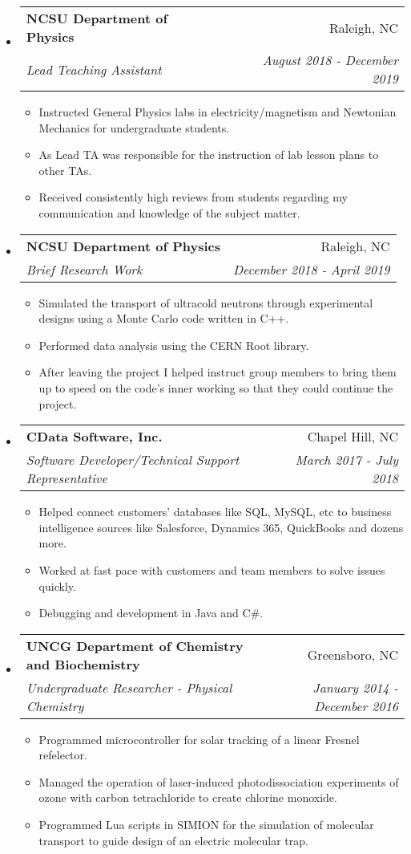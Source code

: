 \documentclass[letterpaper,11pt]{article}
\makeatletter
\newcommand{\resitem}[1]{\item #1 \vspace{-2pt}}
\newcommand{\ressubheading}[4]{
\begin{tabular*}{6.5in}{l@{\cftdotfill{\cftsecdotsep}\extracolsep{\fill}}r}
		\textbf{#1} & #2 \\
		\textit{#3} & \textit{#4} \\
\end{tabular*}\vspace{-6pt}}
\makeatother
\begin{document}
\begin{itemize}
\begin{itemize}
	\end{itemize}



\item
	\ressubheading{NCSU Department of Physics}{Raleigh, NC}{Lead Teaching Assistant}{August 2018 - December 2019}
	\begin{itemize}
      \resitem{Instructed General Physics labs in electricity/magnetism and Newtonian Mechanics for undergraduate students.}
      \resitem{As Lead TA was responsible for the instruction of lab lesson plans to other TAs.}
      \resitem{Received consistently high reviews from students regarding my communication and knowledge of the subject matter.}
	\end{itemize}
	
\item
	\ressubheading{NCSU Department of Physics}{Raleigh, NC}{Brief Research Work}{December 2018 - April 2019}
	\begin{itemize}
      \resitem{Simulated the transport of ultracold neutrons through experimental designs using a Monte Carlo code written in C++.}
      \resitem{Performed data analysis using the CERN Root library.}
      \resitem{After leaving the project I helped instruct group members to bring them up to speed on the code's inner working so that they could continue the project.}
    
	\end{itemize}

\item
	\ressubheading{CData Software, Inc.}{Chapel Hill, NC}{Software Developer/Technical Support Representative}{March 2017 - July 2018}
	\begin{itemize}
      \resitem{Helped connect customers' databases like SQL, MySQL, etc to business intelligence sources like Salesforce, Dynamics 365, QuickBooks and dozens more.}
      \resitem{Worked at fast pace with customers and team members to solve issues quickly.}
      \resitem{Debugging and development in Java and C\#.}
      
	\end{itemize}

\item
	\ressubheading{UNCG Department of Chemistry and Biochemistry}{Greensboro, NC}{Undergraduate Researcher - Physical Chemistry}{January 2014 - December 2016}
	\begin{itemize}
      \resitem{Programmed microcontroller for solar tracking of a linear Fresnel refelector.}
      \resitem{Managed the operation of laser-induced photodissociation experiments of ozone with carbon tetrachloride to create chlorine monoxide.}
      \resitem{Programmed Lua scripts in SIMION for the simulation of molecular transport to guide design of an electric molecular trap.}
	\end{itemize}


\end{itemize}
\end{document}
